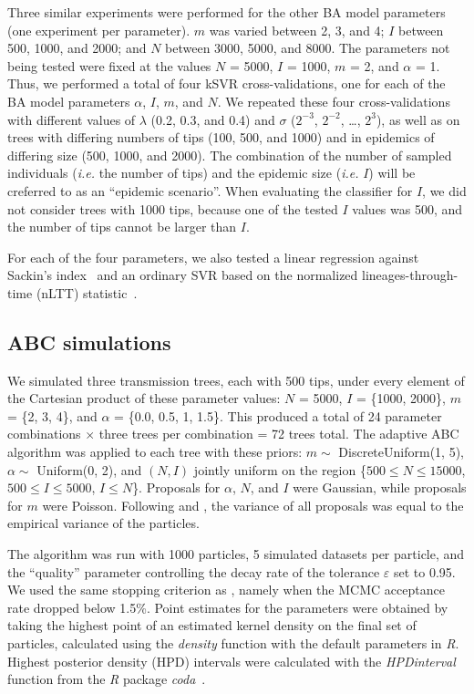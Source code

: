 \documentclass[12pt]{article}\usepackage[]{graphicx}\usepackage[]{color}
\begin{document}
Three similar experiments were performed for the other BA model parameters (one
experiment per parameter). $m$ was varied between 2, 3, and 4; $I$ between 500,
1000, and 2000; and $N$ between 3000, 5000, and 8000. The parameters not being
tested were fixed at the values $N$ = 5000, $I$ = 1000, $m$ = 2, and $\alpha$ =
1. Thus, we performed a total of four kSVR cross-validations, one for each of
the BA model parameters $\alpha$, $I$, $m$, and $N$. We repeated these four
cross-validations with different values of $\lambda$ (0.2, 0.3, and 0.4) and
$\sigma$ ($2^{-3}$, $2^{-2}$, \ldots, $2^3$), as well as on trees with
differing numbers of tips (100, 500, and 1000) and in epidemics of differing
size (500, 1000, and 2000). The combination of the number of sampled
individuals (\textit{i.e.} the number of tips) and the epidemic size
(\textit{i.e.} $I$) will be creferred to as an ``epidemic scenario''. When
evaluating the classifier for $I$, we did not consider trees with 1000 tips,
because one of the tested $I$ values was 500, and the number of tips cannot be
larger than $I$.
  
For each of the four parameters, we also tested a linear regression against
Sackin's index~\autocite{shao1990tree} and an ordinary SVR based on the normalized
lineages-through-time (nLTT) statistic~\autocite{janzen2015approximate}.
  
\subsection{ABC simulations}
  
We simulated three transmission trees, each with 500 tips, under every element
of the Cartesian product of these parameter values: $N$ = 5000, $I$ =
\{1000, 2000\}, $m$ = \{2, 3, 4\}, and $\alpha$ = \{0.0, 0.5, 1,
1.5\}. This produced a total of 24 parameter combinations $\times$ three trees
per combination = 72 trees total. The adaptive ABC algorithm was applied to
each tree with these priors: $m \sim$ DiscreteUniform(1, 5), $\alpha \sim$
Uniform(0, 2), and $(N, I)$ jointly uniform on the region \{$500 \leq N \leq
15000$, $500 \leq I \leq 5000$, $I \leq N$\}. Proposals for $\alpha$, $N$, and
$I$ were Gaussian, while proposals for $m$ were Poisson. Following
\textcite{del2012adaptive} and \textcite{beaumont2009adaptive}, the variance of
all proposals was equal to the empirical variance of the particles.

The algorithm was run with 1000 particles, 5 simulated datasets per particle,
and the ``quality'' parameter controlling the decay rate of the tolerance
$\varepsilon$ set to 0.95. We used the same stopping criterion as
\citeauthor{del2012adaptive}, namely when the MCMC acceptance rate dropped
below 1.5\%. Point estimates for the parameters were obtained by taking the
highest point of an estimated kernel density on the final set of particles,
calculated using the \textit{density} function with the default parameters in
\textit{R}. Highest posterior density (HPD) intervals were calculated with the
\textit{HPDinterval} function from the \textit{R} package
\textit{coda}~\autocite{plummer2006coda}.
  
\end{document}
